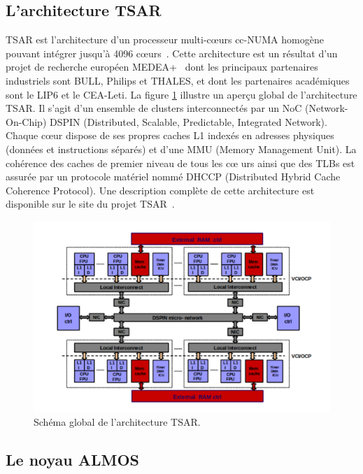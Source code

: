   \subsection{L'architecture TSAR}
  \label{sec:tsar}

    TSAR est l'architecture d’un processeur multi-c\oe urs cc-NUMA homogène
    pouvant intégrer jusqu’à 4096 c\oe urs~\cite{greiner2009tsar}. Cette
    architecture est un résultat d’un projet de recherche européen
    MEDEA+~\cite{tsar2008} dont les principaux partenaires industriels sont
    BULL, Philips et THALES, et dont les partenaires académiques sont le LIP6 et
    le CEA-Leti. La figure \ref{fig:tsar} illustre un aperçu global de
    l'architecture TSAR. Il s'agit d'un ensemble de clusters interconnectés par
    un NoC (Network-On-Chip) DSPIN (Distributed, Scalable, Predictable,
    Integrated Network). Chaque c\oe ur dispose de ses propres caches L1 indexés
    en adresses physiques (données et instructions séparés) et d'une MMU (Memory
    Management Unit). La cohérence des caches de premier niveau de tous les c\oe
    urs ainsi que des TLBs est assurée par un protocole matériel nommé DHCCP
    (Distributed Hybrid Cache Coherence Protocol). Une description complète de
    cette architecture est disponible sur le site du projet
    TSAR~\cite{tsar2008web}.

    \begin{figure}[!h]
      \centering \includegraphics[scale=0.16]{include/img/tsar.png}
      \caption{Schéma global de l'architecture TSAR.~\cite{greiner2009tsar}}
      \label{fig:tsar}
    \end{figure}
  
  \subsection{Le noyau ALMOS}
  \label{sec:almos}

